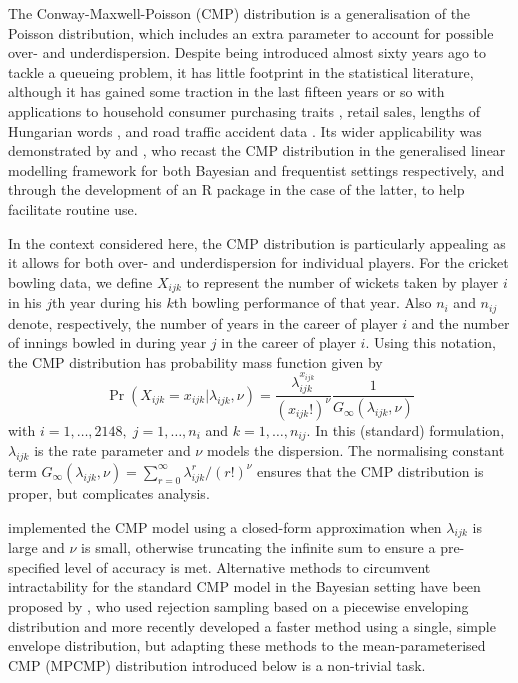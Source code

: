 \documentclass{statsoc}
\newcommand{\CMP}{\text{CMP}}
\newcommand{\indep}{\overset{indep}{\sim }}
\newcommand{\numtestbowlers}{2148}
\begin{document}
The Conway-Maxwell-Poisson (CMP) distribution \citep{ConwayMaxwell} is a generalisation of the Poisson distribution, which includes an extra parameter to account for possible over- and underdispersion. Despite being introduced almost sixty years ago to tackle a queueing problem, it has little footprint in the statistical literature, although it has gained some traction in the last fifteen years or so with applications to household consumer purchasing traits \citep{Boatwright2003}, retail sales, lengths of Hungarian words \citep{Shmueli2005},  and road traffic accident data \citep{Lord2008, Lord2010}. Its wider applicability was demonstrated by \cite{Guikema2008} and \cite{Sellers2010}, who recast the CMP distribution in the generalised linear modelling framework for both Bayesian and frequentist settings respectively, and through the development of an R package \citep{COMPoissonReg} in the case of the latter, to help facilitate routine use. 

In the context considered here, the CMP distribution is particularly appealing as it allows for both over- and underdispersion for individual players.
For the cricket bowling data, we define $X_{ijk}$ to represent the number of wickets taken by player $i$ in his $j$th year during his $k$th bowling performance of that year. %
Also $n_i$ and $n_{ij}$ denote, respectively, the number of years in the
career of player $i$ and the number of innings bowled in during year $j$
in the career of player $i$. Using this notation, the CMP distribution has probability mass function given by
\[
\Pr(X_{ijk} = x_{ijk} |\lambda_{ijk}, \nu) = \frac{\lambda_{ijk}^{x_{ijk}}}{(x_{ijk}!)^{\nu}} \frac{1}{G_\infty(\lambda_{ijk}, \nu)}
\]
with $i=1,\ldots, \numtestbowlers, \; j=1,\ldots,n_i$ and  $k=1,\ldots, n_{ij}$. In this (standard) formulation, $\lambda_{ijk}$ is  the rate parameter and $\nu$ models the dispersion. The normalising constant term $G_{\infty}(\lambda_{ijk}, \nu) = \sum_{r=0}^{\infty} \lambda_{ijk}^r/(r!)^{\nu}$ ensures that the CMP distribution is proper, but complicates analysis.

\citet{COMPoissonReg} implemented the CMP model using a closed-form approximation \citep{Shmueli2005, Gillispie2015} when $\lambda_{ijk}$ is large and $\nu$ is small, otherwise truncating the infinite sum to ensure a pre-specified level of accuracy is met.
Alternative methods to circumvent intractability for the standard CMP model in the Bayesian setting have been proposed by \cite{Chanialidis2018}, who used rejection sampling based on a piecewise enveloping distribution and more recently \cite{Benson2020} developed a faster method using a single, simple envelope distribution, but adapting these methods to the mean-parameterised CMP (MPCMP) distribution introduced below is a non-trivial task. 
\end{document}

